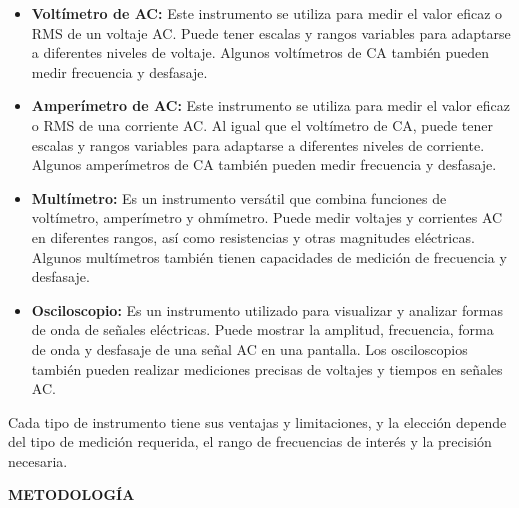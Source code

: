 \documentclass[12pt]{article}
\begin{document}
	\begin{itemize}
		\item \textbf{Voltímetro de AC:} Este instrumento se utiliza para medir el valor eficaz o RMS de un voltaje AC. Puede tener escalas y rangos variables para adaptarse a diferentes niveles de voltaje. Algunos voltímetros de CA también pueden medir frecuencia y desfasaje.
		
		\item \textbf{Amperímetro de AC:} Este instrumento se utiliza para medir el valor eficaz o RMS de una corriente AC. Al igual que el voltímetro de CA, puede tener escalas y rangos variables para adaptarse a diferentes niveles de corriente. Algunos amperímetros de CA también pueden medir frecuencia y desfasaje.
		
		\item \textbf{Multímetro:} Es un instrumento versátil que combina funciones de voltímetro, amperímetro y ohmímetro. Puede medir voltajes y corrientes AC en diferentes rangos, así como resistencias y otras magnitudes eléctricas. Algunos multímetros también tienen capacidades de medición de frecuencia y desfasaje.
		
		\item \textbf{Osciloscopio:} Es un instrumento utilizado para visualizar y analizar formas de onda de señales eléctricas. Puede mostrar la amplitud, frecuencia, forma de onda y desfasaje de una señal AC en una pantalla. Los osciloscopios también pueden realizar mediciones precisas de voltajes y tiempos en señales AC.
		
	\end{itemize}
	
	Cada tipo de instrumento tiene sus ventajas y limitaciones, y la elección depende del tipo de medición requerida, el rango de frecuencias de interés y la precisión necesaria.

	\newpage
	
	\begin{center}
		\textbf{\large METODOLOGÍA}\\
	\end{center}
	
	\renewcommand{\theenumi}{\alph{enumi}} %
	
\end{document}
